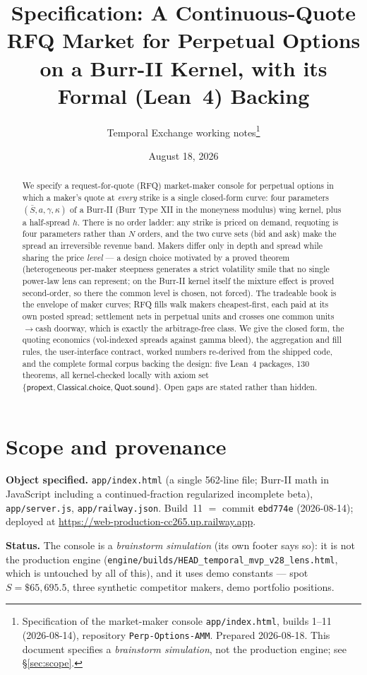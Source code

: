 \documentclass[11pt]{article}
\title{Specification: A Continuous-Quote RFQ Market for Perpetual Options\\
on a Burr-II Kernel, with its Formal (Lean~4) Backing}
\author{Temporal Exchange working notes\thanks{Specification of the market-maker console
\texttt{app/index.html}, builds 1--11 (2026-08-14), repository \texttt{Perp-Options-AMM}.
Prepared 2026-08-18. This document specifies a \emph{brainstorm simulation}, not the production
engine; see \S\ref{sec:scope}.}}
\date{August 18, 2026}
\newcommand{\Sbar}{\bar{S}}
\begin{document}
\maketitle

\begin{abstract}
We specify a request-for-quote (RFQ) market-maker console for perpetual options in which a
maker's quote at \emph{every} strike is a single closed-form curve: four parameters
$(\Sbar,a,\gamma,\kappa)$ of a Burr-II (Burr Type XII in the moneyness modulus) wing kernel,
plus a half-spread $h$. There is no order ladder: any strike is priced on demand, requoting is
four parameters rather than $N$ orders, and the two curve sets (bid and ask) make the spread an
irreversible revenue band. Makers differ only in depth and spread while sharing the price
\emph{level} --- a design choice motivated by a proved theorem (heterogeneous per-maker steepness
generates a strict volatility smile that no single power-law lens can represent; on the Burr-II
kernel itself the mixture effect is proved second-order, so there the common level is chosen, not
forced). The tradeable book is the
envelope of maker curves; RFQ fills walk makers cheapest-first, each paid at its own posted
spread; settlement nets in perpetual units and crosses one common units$\to$cash doorway, which
is exactly the arbitrage-free class. We give the closed form, the quoting economics
(vol-indexed spreads against gamma bleed), the aggregation and fill rules, the user-interface
contract, worked numbers re-derived from the shipped code, and the complete formal corpus
backing the design: five Lean~4 packages, 130 theorems, all kernel-checked locally with axiom
set $\{\mathsf{propext},\mathsf{Classical.choice},\mathsf{Quot.sound}\}$. Open gaps are stated
rather than hidden.
\end{abstract}

\section{Scope and provenance}\label{sec:scope}

\textbf{Object specified.} \texttt{app/index.html} (a single 562-line file; Burr-II math in
JavaScript including a continued-fraction regularized incomplete beta), \texttt{app/server.js},
\texttt{app/railway.json}. Build~11 $=$ commit \texttt{ebd774e} (2026-08-14); deployed at
\url{https://web-production-cc265.up.railway.app}.

\textbf{Status.} The console is a \emph{brainstorm simulation} (its own footer says so): it is
not the production engine (\texttt{engine/builds/HEAD\_temporal\_mvp\_v28\_lens.html}, which is
untouched by all of this), and it uses demo constants --- spot $S=\$65{,}695.5$, three synthetic
competitor makers, demo portfolio positions.
\end{document}
